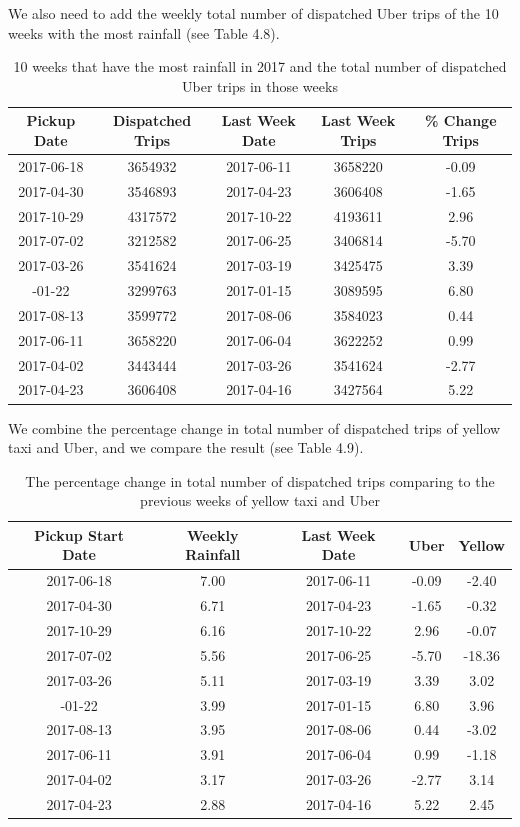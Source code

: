 \documentclass[12pt,twoside]{reedthesis}
\theoremstyle{definition}
\theoremstyle{definition}
\theoremstyle{definition}
\theoremstyle{remark}
\begin{document}
We also need to add the weekly total number of dispatched Uber trips of
the 10 weeks with the most rainfall (see Table 4.8).
\begin{table}

\caption{\label{tab:unnamed-chunk-77}10 weeks that have the most rainfall in 2017 and the total number of dispatched Uber trips in those weeks}
\centering
\begin{tabular}[t]{ccccc}
\toprule
Pickup Date & Dispatched Trips & Last Week Date & Last Week Trips & \% Change Trips\\
\midrule
2017-06-18 & 3654932 & 2017-06-11 & 3658220 & -0.09\\
2017-04-30 & 3546893 & 2017-04-23 & 3606408 & -1.65\\
2017-10-29 & 4317572 & 2017-10-22 & 4193611 & 2.96\\
2017-07-02 & 3212582 & 2017-06-25 & 3406814 & -5.70\\
2017-03-26 & 3541624 & 2017-03-19 & 3425475 & 3.39\\
\addlinespace
2017-01-22 & 3299763 & 2017-01-15 & 3089595 & 6.80\\
2017-08-13 & 3599772 & 2017-08-06 & 3584023 & 0.44\\
2017-06-11 & 3658220 & 2017-06-04 & 3622252 & 0.99\\
2017-04-02 & 3443444 & 2017-03-26 & 3541624 & -2.77\\
2017-04-23 & 3606408 & 2017-04-16 & 3427564 & 5.22\\
\bottomrule
\end{tabular}
\end{table}
We combine the percentage change in total number of dispatched trips of
yellow taxi and Uber, and we compare the result (see Table 4.9).
\begin{table}

\caption{\label{tab:unnamed-chunk-79}The percentage change in total number of dispatched trips comparing to the previous weeks of yellow taxi and Uber}
\centering
\begin{tabular}[t]{ccccc}
\toprule
Pickup Start Date & Weekly Rainfall & Last Week Date & Uber & Yellow\\
\midrule
2017-06-18 & 7.00 & 2017-06-11 & -0.09 & -2.40\\
2017-04-30 & 6.71 & 2017-04-23 & -1.65 & -0.32\\
2017-10-29 & 6.16 & 2017-10-22 & 2.96 & -0.07\\
2017-07-02 & 5.56 & 2017-06-25 & -5.70 & -18.36\\
2017-03-26 & 5.11 & 2017-03-19 & 3.39 & 3.02\\
\addlinespace
2017-01-22 & 3.99 & 2017-01-15 & 6.80 & 3.96\\
2017-08-13 & 3.95 & 2017-08-06 & 0.44 & -3.02\\
2017-06-11 & 3.91 & 2017-06-04 & 0.99 & -1.18\\
2017-04-02 & 3.17 & 2017-03-26 & -2.77 & 3.14\\
2017-04-23 & 2.88 & 2017-04-16 & 5.22 & 2.45\\
\bottomrule
\end{tabular}
\end{table}
\end{document}

